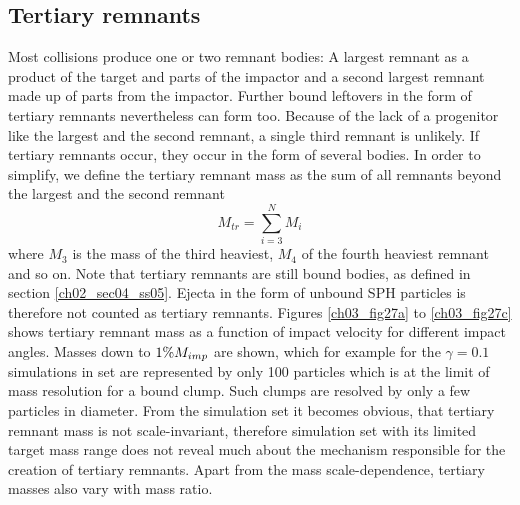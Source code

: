 \subsection{Tertiary remnants}
Most collisions produce one or two remnant bodies: A largest remnant as a product of the target and parts of the impactor and a second largest remnant made up of parts from the impactor. Further bound leftovers in the form of tertiary remnants nevertheless can form too. Because of the lack of a progenitor like the largest and the second remnant, a single third remnant is unlikely. If tertiary remnants occur, they occur in the form of several bodies. In order to simplify, we define the tertiary remnant mass as the sum of all remnants beyond the largest and the second remnant
\begin{equation}
M_{tr} = \sum_{i = 3}^N M_i
\end{equation}
where $M_3$ is the mass of the third heaviest, $M_4$ of the fourth heaviest remnant and so on. Note that tertiary remnants are still bound bodies, as defined in section \ref{ch02_sec04_ss05}. Ejecta in the form of unbound SPH particles is therefore not counted as tertiary remnants. Figures \ref{ch03_fig27a} to \ref{ch03_fig27c} shows tertiary remnant mass as a function of impact velocity for different impact angles. Masses down to $1 \% M_{imp}$ are shown, which for example for the $\gamma = 0.1$ simulations in set \css are represented by only 100 particles which is at the limit of mass resolution for a bound clump. Such clumps are resolved by only a few particles in diameter. From the \css simulation set it becomes obvious, that tertiary remnant mass is not scale-invariant, therefore simulation set \rss with its limited target mass range does not reveal much about the mechanism responsible for the creation of tertiary remnants. Apart from the mass scale-dependence, tertiary masses also vary with mass ratio. 

